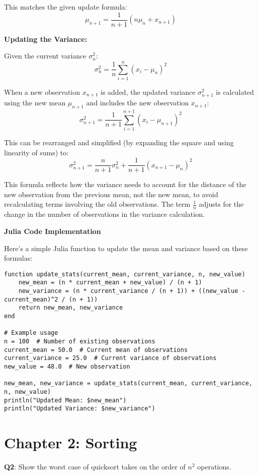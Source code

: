\documentclass[8pt]{article}
\begin{document}
This matches the given update formula:
\[ \mu_{n+1} = \frac{1}{n+1} (n\mu_n + x_{n+1}) \]

\textbf{Updating the Variance:}

Given the current variance \(\sigma_n^2\):
\[ \sigma_n^2 = \frac{1}{n} \sum_{i=1}^n (x_i - \mu_n)^2 \]

When a new observation \(x_{n+1}\) is added, the updated variance \(\sigma_{n+1}^2\) is calculated using the new mean \(\mu_{n+1}\) and includes the new observation \(x_{n+1}\):
\[ \sigma_{n+1}^2 = \frac{1}{n+1} \sum_{i=1}^{n+1} (x_i - \mu_{n+1})^2 \]

This can be rearranged and simplified (by expanding the square and using linearity of sums) to:
\[ \sigma_{n+1}^2 = \frac{n}{n+1} \sigma_n^2 + \frac{1}{n+1} (x_{n+1} - \mu_n)^2 \]

This formula reflects how the variance needs to account for the distance of the new observation from the previous mean, not the new mean, to avoid recalculating terms involving the old observations. The term \(\frac{1}{n}\) adjusts for the change in the number of observations in the variance calculation.

\textbf{Julia Code Implementation}

Here's a simple Julia function to update the mean and variance based on these formulas:

\begin{verbatim}
function update_stats(current_mean, current_variance, n, new_value)
    new_mean = (n * current_mean + new_value) / (n + 1)
    new_variance = (n * current_variance / (n + 1)) + ((new_value - current_mean)^2 / (n + 1))
    return new_mean, new_variance
end

# Example usage
n = 100  # Number of existing observations
current_mean = 50.0  # Current mean of observations
current_variance = 25.0  # Current variance of observations
new_value = 48.0  # New observation

new_mean, new_variance = update_stats(current_mean, current_variance, n, new_value)
println("Updated Mean: $new_mean")
println("Updated Variance: $new_variance")
\end{verbatim}

\newpage
\section*{Chapter 2: Sorting}

\textbf{Q2}: Show the worst case of quicksort takes on the order of \(n^2\) operations.
\end{document}
